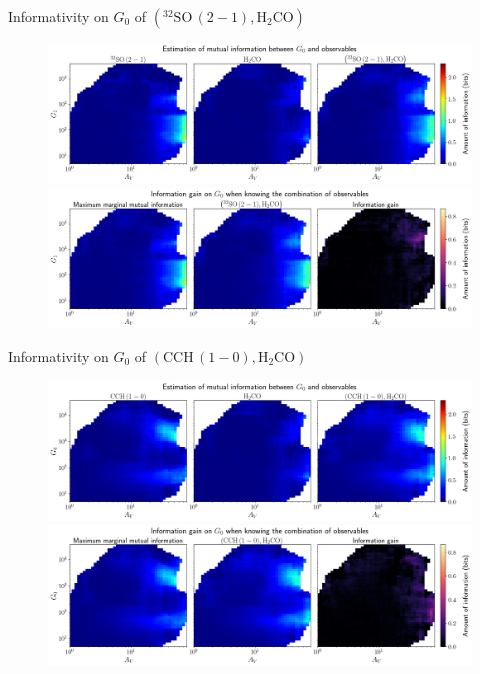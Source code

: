 \documentclass{beamer}
\begin{document}
\begin{frame}{Informativity on $G_0$ of $\left(\mathrm{^{32}SO\,(2-1)},\mathrm{H_2CO}\right)$}
    \begin{figure}
        \centering
        \includegraphics[width=0.95\linewidth]{../mi/g0__32so21_h2co_mi.png}
        \vfill
        \includegraphics[width=0.95\linewidth]{../mi/g0__32so21_h2co_mi_gain.png}
    \end{figure}
\end{frame}

\begin{frame}{Informativity on $G_0$ of $\left(\mathrm{CCH\,(1-0)},\mathrm{H_2CO}\right)$}
    \begin{figure}
        \centering
        \includegraphics[width=0.95\linewidth]{../mi/g0__cch10_h2co_mi.png}
        \vfill
        \includegraphics[width=0.95\linewidth]{../mi/g0__cch10_h2co_mi_gain.png}
    \end{figure}
\end{frame}
\end{document}
